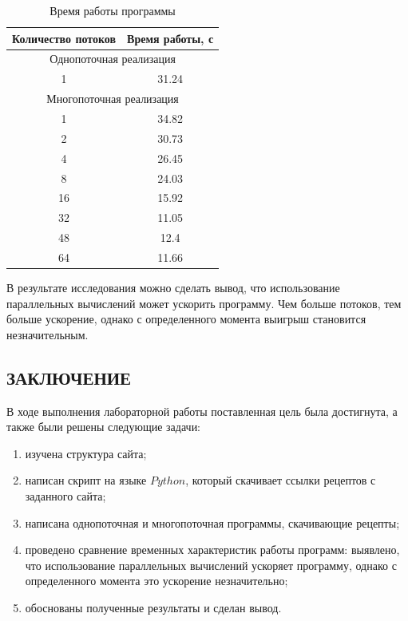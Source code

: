 \documentclass{article}
\begin{document}
\clearpage\begin{table}[h]
	\begin{center}
	\caption{\label{table} Время работы программы}
	\begin{tabular}{|c|c|}
		\hline
		Количество потоков & Время работы, с 
		\\ \hline
		\multicolumn{2}{|c|}{Однопоточная реализация} 
		\\ \hline
		1 & 31.24 
		\\ \hline
		\multicolumn{2}{|c|}{Многопоточная реализация} 
		\\ \hline
		1 & 34.82 
		\\ \hline
		2 & 30.73 
		\\ \hline
		4 & 26.45 
		\\ \hline
		8 & 24.03 
		\\ \hline
		16 & 15.92
		\\ \hline
		32 & 11.05
		\\ \hline
		48 & 12.4
		\\ \hline
		64 & 11.66
		\\ \hline
	\end{tabular}
	\end{center}
\end{table}

В результате исследования можно сделать вывод, что использование параллельных вычислений может ускорить программу.
Чем больше потоков, тем больше ускорение, однако с определенного момента выигрыш становится незначительным.

\clearpage\begin{center}\section*{ЗАКЛЮЧЕНИЕ}\end{center}
В ходе выполнения лабораторной работы поставленная цель была достигнута, а также были решены следующие задачи:
\begin{enumerate}
	\item изучена структура сайта;
	\item написан скрипт на языке $Python$, который скачивает ссылки рецептов с заданного сайта;
	\item написана однопоточная и многопоточная программы, скачивающие рецепты;
	\item проведено сравнение временных характеристик работы программ: выявлено, что использование параллельных
вычислений ускоряет программу, однако с определенного момента это ускорение незначительно;
	\item обоснованы полученные результаты и сделан вывод.
\end{enumerate} 
\end{document}
